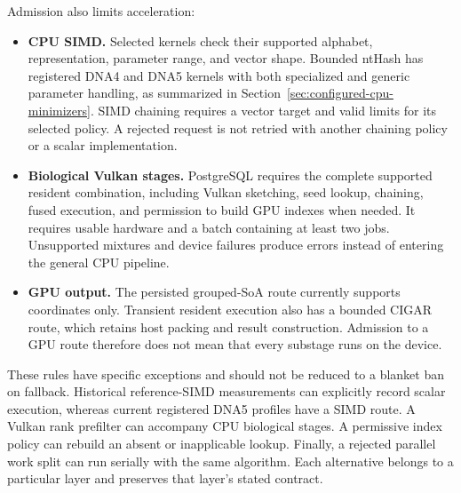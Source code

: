Admission also limits acceleration:
\begin{itemize}
  \item \textbf{CPU SIMD.} Selected kernels check their supported alphabet,
    representation, parameter range, and vector shape. Bounded ntHash
    has registered DNA4 and DNA5 kernels with both specialized and generic
    parameter handling, as summarized in
    Section~\ref{sec:configured-cpu-minimizers}. SIMD chaining requires a vector target
    and valid limits for its selected policy. A rejected request is not
    retried with another chaining policy or a scalar implementation.
  \item \textbf{Biological Vulkan stages.} PostgreSQL requires the complete
    supported resident combination, including Vulkan sketching, seed lookup,
    chaining, fused execution, and permission to build GPU indexes when
    needed. It requires
    usable hardware and a batch containing at least two jobs. Unsupported
    mixtures and device failures produce errors instead of entering the
    general CPU pipeline.
  \item \textbf{GPU output.} The persisted grouped-SoA route currently
    supports coordinates only. Transient resident execution also has a
    bounded CIGAR route, which retains host packing and result construction.
    Admission to a GPU route therefore does not mean that every substage
    runs on the device.
\end{itemize}

These rules have specific exceptions and should not be reduced to a blanket
ban on fallback. Historical reference-SIMD measurements can explicitly record
scalar execution, whereas current registered DNA5 profiles have a SIMD route.
A Vulkan rank prefilter
can accompany CPU biological stages. A permissive index policy can rebuild
an absent or inapplicable lookup. Finally, a rejected parallel work split can
run serially with the same algorithm. Each alternative belongs to a
particular layer and preserves that layer's stated contract.
